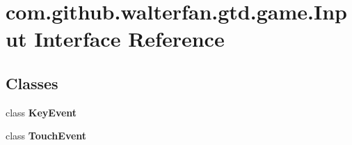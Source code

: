 \hypertarget{interfacecom_1_1github_1_1walterfan_1_1gtd_1_1game_1_1Input}{\section{com.\-github.\-walterfan.\-gtd.\-game.\-Input Interface Reference}
\label{interfacecom_1_1github_1_1walterfan_1_1gtd_1_1game_1_1Input}
}
\subsection*{Classes}
\begin{DoxyCompactItemize}
\item 
class {\bfseries Key\-Event}
\item 
class {\bfseries Touch\-Event}
\end{DoxyCompactItemize}
